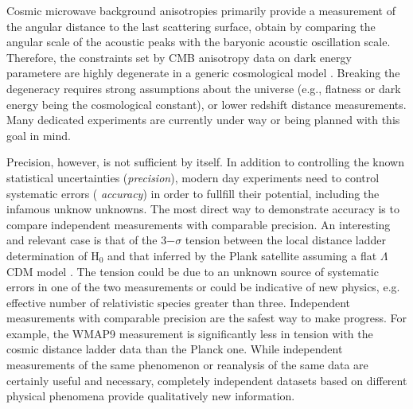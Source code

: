 Cosmic microwave background anisotropies primarily provide a
measurement of the angular distance to the last scattering surface,
obtain by comparing the angular scale of the acoustic peaks with the
baryonic acoustic oscillation scale. Therefore, the constraints set by
CMB anisotropy data on dark energy parametere are highly degenerate in
a generic cosmological model
\citep[e.g.,][]{Pla15}. Breaking the degeneracy requires strong
assumptions about the universe (e.g., flatness or dark energy being
the cosmological constant), or lower redshift distance
measurements. Many dedicated experiments are currently under way or
being planned with this goal in mind.



Precision, however, is not sufficient by itself. In addition to
controlling the known statistical uncertainties ({\it precision}),
modern day experiments need to control systematic errors ({\it
accuracy}) in order to fullfill their potential, including the
infamous unknow unknowns. The most direct way to demonstrate accuracy
is to compare independent measurements with comparable precision. An
interesting and relevant case is that of the 3$-\sigma$ tension
between the local distance ladder determination of H$_0$
\citep{Rie++16} and that inferred by the Plank satellite assuming a
flat $\Lambda$CDM model \citep{Pla15}. The tension could be due to an
unknown source of systematic errors in one of the two measurements or
could be indicative of new physics, e.g. effective number of
relativistic species greater than three. Independent measurements with
comparable precision are the safest way to make progress. For example,
the WMAP9 measurement \citep{Cal++13} is significantly less in tension
with the cosmic distance ladder data than the Planck one. While
independent measurements of the same phenomenon or reanalysis of the
same data \citep{Efs14,SFH15} are certainly useful and necessary,
completely independent datasets based on different physical phenomena
provide qualitatively new information.

